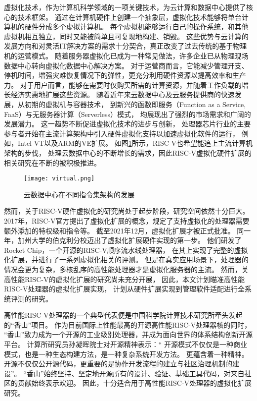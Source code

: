 虚拟化技术，作为计算机科学领域的一项关键技术，为云计算和数据中心提供了核心的技术框架。
通过在计算机硬件上创建一个抽象层，虚拟化技术能够将单台计算机的硬件分成多个虚拟计算机。
每个虚拟机能够运行自己的操作系统，和其他虚拟机相互独立，同时又能被简单且可复现地构建、销毁。
这些优势与云计算的发展方向和对灵活IT解决方案的需求十分契合，真正改变了过去传统的基于物理机的运营模式。
随着服务器虚拟化已成为一种常见做法，许多企业已从物理现场数据中心转向虚拟化数据中心解决方案。
对于运营商而言，它能减少管理开支、停机时间，增强灾难恢复情况下的弹性，更充分利用硬件资源以提高效率和生产力。
对于用户而言，能够在需要时仅购买所需的计算资源，并随着工作负载的增长经济实惠地扩展这些资源。
随着近年来云数据中心及云服务提供商的快速发展，从初期的虚拟机与容器技术，
到新兴的函数即服务（Function as a Service, FaaS）与无服务器计算（Serverless）模式，
均展现出了强烈的市场需求和广阔的发展潜力。
这一趋势不断促进虚拟化技术的进步与创新，
处理器芯片行业的主要参与者开始在主流计算架构中引入硬件虚拟化支持以加速虚拟化软件的运行，
例如，Intel VT\cite{intel-VT2005Computer}以及ARM的VE扩展\cite{armve2018}。
如图\ref{fig:isa-vir}所示，RISC-V也希望能追上主流计算机架构的步伐，
处理云数据中心的不断增长的需求，因此RISC-V虚拟化硬件扩展的相关研究在不断的被积极推进。

\begin{figure}[htbp]
\centering
\texttt{[image: virtual.png]}
\caption{云数据中心在不同指令集架构的发展}
\label{fig:isa-vir}
\end{figure}

然而，关于RISC-V硬件虚拟化的研究尚处于起步阶段，研究空间依然十分巨大。
2017年，RISC-V官方提出了虚拟化扩展的概念，规定了支持虚拟化的处理器需要额外添加的特权级和指令等。
截至2021年12月，虚拟化扩展才被正式批准。
同一年，加州大学的伯克利分校迈出了虚拟化扩展硬件实现的第一步。
他们研发了Rocket Chip\cite{itco2022rocket}，一个开源的RISC-V顺序流水线处理器，
在其上实现了完整的虚拟化扩展，并进行了一系列虚拟化相关的评测。
但是在真实应用场景下，处理器的情况会更为复杂，多核乱序的高性能处理器才是虚拟化服务器的主流。
然而，关高性能RISC-V的虚拟化扩展的研究尚未充分开展，
因此，本文计划瞄准高性能RISC-V处理器的虚拟化扩展实现，
计划从硬件扩展实现到管理软件适配进行全系统评测的研究。

高性能RISC-V处理器的一个典型代表便是中国科学院计算技术研究所牵头发起的“香山”项目。
作为目前国际上性能最高的开源高性能RISC-V处理器核的同时，
“香山”致力成为一个开源的工业级别处理器，并成为面向世界的体系结构创新开源平台。
计算所研究员孙凝晖院士对开源精神表示：“
开源模式不仅仅是一种商业模式，也是一种生态构建方法，是一种复杂系统开发方法。
更蕴含着一种精神。开源不仅仅公开源代码，更重要的是协作开发流程的建立与社区治理机制的建设”。
“香山”始终坚持、坚定地开源所有的设计、验证、基础工具代码，对来自社区的贡献始终表示欢迎。
因此，十分适合用于高性能RISC-V处理器的虚拟化扩展研究。

